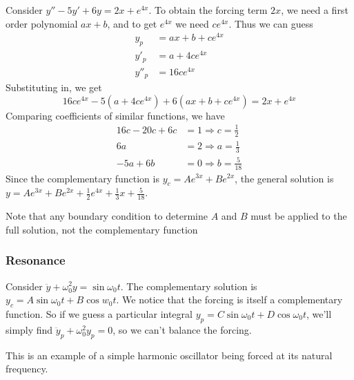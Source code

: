 \documentclass[a4paper]{article}
\begin{document}
\begin{eg}
  Consider $y'' - 5y' + 6y = 2x + e^{4x}$. To obtain the forcing term $2x$, we need a first order polynomial $ax + b$, and to get $e^{4x}$ we need $ce^{4x}$. Thus we can guess
  \begin{align*}
    y_p &= ax + b + ce^{4x}\\
    y'_p &= a + 4ce^{4x}\\
    y''_p &= 16ce^{4x}
  \end{align*}
  Substituting in, we get
  \[
    16ce^{4x} - 5(a + 4ce^{4x}) + 6(ax + b + ce^{4x}) = 2x + e^{4x}
  \]
  Comparing coefficients of similar functions, we have
  \begin{align*}
    16c - 20c + 6c &= 1\Rightarrow c = \frac{1}{2}\\
    6a &= 2 \Rightarrow a = \frac{1}{3}\\
    -5a + 6b &= 0 \Rightarrow b = \frac{5}{18}
  \end{align*}
  Since the complementary function is $y_c = Ae^{3x} + Be^{2x}$, the general solution is $y = Ae^{3x} + Be^{2x} + \frac{1}{2}e^{4x} + \frac{1}{3}x + \frac{5}{18}$.

  Note that any boundary condition to determine $A$ and $B$ must be applied to the full solution, not the complementary function
\end{eg}
\subsubsection{Resonance}
Consider $\ddot y + \omega_0^2 y = \sin \omega_0 t$. The complementary solution is $y_c = A\sin \omega_0 t + B\cos w_0 t$. We notice that the forcing is itself a complementary function. So if we guess a particular integral $y_p = C\sin \omega_0 t + D\cos \omega_0 t$, we'll simply find $\ddot y_p + \omega_0 ^2 y_p = 0$, so we can't balance the forcing.

This is an example of a simple harmonic oscillator being forced at its natural frequency.
\end{document}
